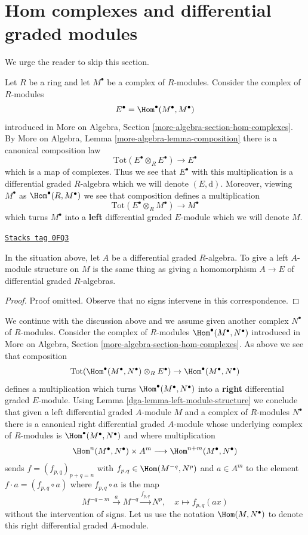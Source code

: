 \section{Hom complexes and differential graded modules}
\label{dga-section-hom-complexes}
We urge the reader to skip this section.

\medskip\noindent
Let $R$ be a ring and let $M^\bullet$ be a complex of $R$-modules.
Consider the complex of $R$-modules
$$
E^\bullet = \Hom^\bullet(M^\bullet, M^\bullet)
$$
introduced in
More on Algebra, Section \ref{more-algebra-section-hom-complexes}.
By More on Algebra, Lemma \ref{more-algebra-lemma-composition}
there is a canonical composition law
$$
\text{Tot}(E^\bullet \otimes_R E^\bullet) \to E^\bullet
$$
which is a map of complexes. Thus we see that $E^\bullet$ with this
multiplication is a differential graded $R$-algebra which we will
denote $(E, \text{d})$. Moreover, viewing $M^\bullet$ as
$\Hom^\bullet(R, M^\bullet)$ we see that composition defines a multiplication
$$
\text{Tot}(E^\bullet \otimes_R M^\bullet) \to M^\bullet
$$
which turns $M^\bullet$ into a {\bf left} differential graded $E$-module
which we will denote $M$.

\begin{lemma}
\label{dga-lemma-left-module-structure}
\href{https://stacks.math.columbia.edu/tag/0FQ3}{\texttt{Stacks tag 0FQ3}}

In the situation above, let $A$ be a differential graded $R$-algebra.
To give a left $A$-module structure on $M$ is the same thing as
giving a homomorphism $A \to E$ of differential graded $R$-algebras.
\end{lemma}

\begin{proof}
Proof omitted. Observe that no signs intervene in this correspondence.
\end{proof}

We continue with the discussion above and we assume given another
complex $N^\bullet$ of $R$-modules. Consider the complex
of $R$-modules $\Hom^\bullet(M^\bullet, N^\bullet)$ introduced in
More on Algebra, Section \ref{more-algebra-section-hom-complexes}.
As above we see that composition
$$
\text{Tot}(\Hom^\bullet(M^\bullet, N^\bullet) \otimes_R E^\bullet)
\to \Hom^\bullet(M^\bullet, N^\bullet)
$$
defines a multiplication which turns $\Hom^\bullet(M^\bullet, N^\bullet)$
into a {\bf right} differential graded $E$-module. Using
Lemma \ref{dga-lemma-left-module-structure} we
conclude that given a left differential graded $A$-module $M$ and
a complex of $R$-modules $N^\bullet$ there is a canonical
right differential graded $A$-module whose underlying complex
of $R$-modules is $\Hom^\bullet(M^\bullet, N^\bullet)$ and
where multiplication
$$
\Hom^n(M^\bullet, N^\bullet) \times A^m \longrightarrow
\Hom^{n + m}(M^\bullet, N^\bullet)
$$
sends $f = (f_{p, q})_{p + q = n}$ with $f_{p, q} \in \Hom(M^{-q}, N^p)$
and $a \in A^m$ to the element $f \cdot a = (f_{p, q} \circ a)$ where
$f_{p, q} \circ a$ is the map
$$
M^{-q - m} \xrightarrow{a} M^{-q} \xrightarrow{f_{p, q}} N^p, \quad
x \longmapsto f_{p, q}(ax)
$$
without the intervention of signs. Let us use the notation
$\Hom(M, N^\bullet)$ to denote this right differential graded $A$-module.

